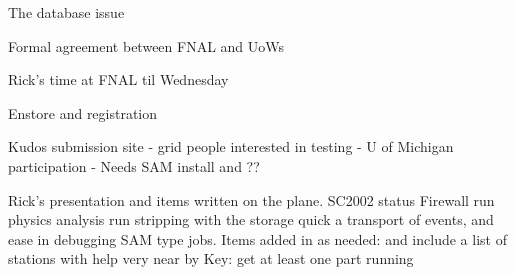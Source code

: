 

The database issue


Formal agreement between FNAL and UoWs  

Rick's time at FNAL til Wednesday

Enstore and registration

Kudos submission site
	- grid people interested in testing
	- U of Michigan participation
	- Needs SAM install and ?? 
	
Rick's presentation and items written on the plane.
	SC2002 status
	Firewall
	run physics analysis
	run stripping with the storage
	quick a transport of events, and ease in debugging SAM type jobs.  
	Items added in as needed: and include a list of stations with help very near by
	Key: get at least one part running

